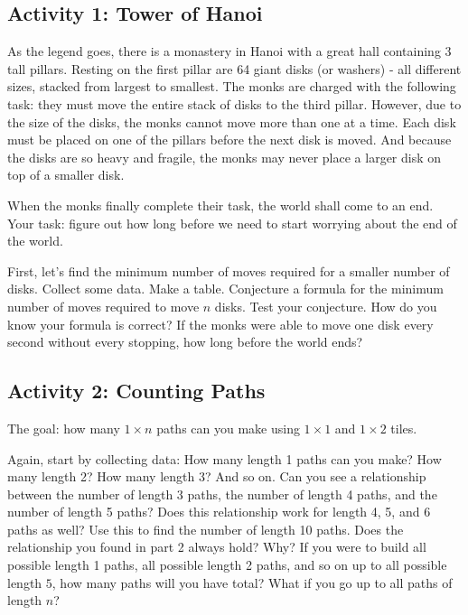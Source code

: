 \documentclass[11pt]{exam}
\begin{document}

\subsection*{Activity 1: Tower of Hanoi}

As the legend goes, there is a monastery in Hanoi with a great hall containing 3 tall pillars.  Resting on the first pillar are 64 giant disks (or washers) - all different sizes, stacked from largest to smallest.  The monks are charged with the following task: they must move the entire stack of disks to the third pillar.  However, due to the size of the disks, the monks cannot move more than one at a time.  Each disk must be placed on one of the pillars before the next disk is moved.  And because the disks are so heavy and fragile, the monks may never place a larger disk on top of a smaller disk.

When the monks finally complete their task, the world shall come to an end.  Your task: figure out how long before we need to start worrying about the end of the world.

\begin{questions}
  \question First, let's find the minimum number of moves required for a smaller number of disks.  Collect some data. Make a table.
  \vfill
  \question Conjecture a formula for the minimum number of moves required to move $n$ disks.  Test your conjecture.  How do you know your formula is correct?
  \vfill
  \question If the monks were able to move one disk every second without every stopping, how long before the world ends?
  
  \vfill
  
\end{questions}


\newpage

\subsection*{Activity 2: Counting Paths}

The goal: how many $1 \times n$ paths can you make using $1\times 1$ and $1 \times 2$ tiles.
\begin{questions}
  \question Again, start by collecting data: How many length 1 paths can you make?  How many length 2?  How many length 3? And so on. 
  \vfill
  \question Can you see a relationship between the number of length 3 paths, the number of length 4 paths, and the number of length 5 paths?  Does this relationship work for length 4, 5, and 6 paths as well?  Use this to find the number of length 10 paths.
  \vfill
  \question Does the relationship you found in part 2 always hold?  Why?
  \vfill
  \question If you were to build all possible length 1 paths, all possible length 2 paths, and so on up to all possible length $5$, how many paths will you have total?  What if you go up to all paths of length $n$?
  \vfill
\end{questions}
\end{document}
